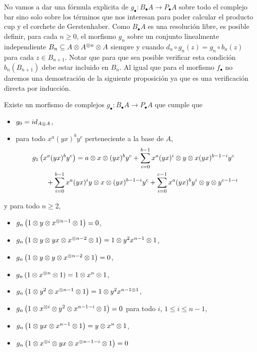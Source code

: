 \documentclass[fleqn,../tesis.tex]{subfiles}
\begin{document}
No vamos a dar una fórmula explicita de $g_{\bullet} : B_{\bullet}A \to P_{\bullet}A$ sobre todo el complejo bar
sino solo sobre los términos que nos interesan para poder calcular el producto cup y el corchete de Gerstenhaber.
Como $B_{\bullet}A$ es una resolución libre, es posible definir, para cada $n \geq  0$, el morfismo $g_n$
sobre un conjunto linealmente independiente $B_n \subseteq A\otimes A^{\otimes n}\otimes A$ siempre y cuando
$d_n \circ g_n(z) = g_n \circ b_n(z)$ para cada $z \in B_{n + 1}$. Notar que para que sea posible verificar esta
condición $b_n(B_{n + 1})$ debe estar incluido en $ B_{n}$. Al igual que para el morfismo $f_{\bullet}$
no daremos una demostración de la siguiente proposición ya que es una verificación directa por inducción.

\begin{prop}
	Existe un morfismo de complejos $g_{\bullet} : B_{\bullet}A \to P_{\bullet}A$ que cumple que
	\begin{itemize}
		\item $g_0 = id_{A\otimes A}$,
		\item para todo $x^{a}(yx)^{b}y^c$ perteneciente a la base de $A$,
		\begin{align*}
			&g_1\left(x^{a}(yx)^{b}y^c\right) = a\otimes x \otimes (yx)^by^c
				+ \sum_{i = 0}^{b - 1} x^{a}(yx)^{i}\otimes y \otimes x(yx)^{b - 1 - i}y^c\\
			&\qquad + \sum_{i = 0}^{b - 1}x^{a}(yx)^{i}y \otimes x \otimes (yx)^{b - 1 - i}y^c
				+ \sum_{i =0}^{c - 1}x^{a}(yx)^{b} y^{i}\otimes y \otimes y^{c - 1 - i}
		\end{align*}
	\end{itemize}
	y para todo $n \geq 2$,
	\begin{itemize}
		\item $g_n\left(1\otimes y \otimes x^{\otimes n - 1}\otimes 1\right) = 0$,
		\item $g_n\left(1\otimes y \otimes yx \otimes x^{ \otimes n - 2} \otimes 1\right) = 1\otimes y^2 x^{n - 1} \otimes 1$,
		\item $g_n\left(1\otimes y \otimes y \otimes x^{\otimes n - 2} \otimes 1\right) = 0$,
		\item $g_n\left(1\otimes x^{\otimes n} \otimes 1\right) = 1\otimes x^n \otimes 1$,
		\item $g_n\left(1\otimes y^2 \otimes x^{\otimes n - 1}\otimes 1\right) = 1 \otimes y^{2}x^{n - 1 \otimes 1}$,
		\item $g_n\left(1\otimes x^{\otimes i} \otimes y^{2} \otimes x^{n - 1 - i} \otimes 1\right) =  0$
			para todo $i$, $1 \leq i \leq n  - 1$,
		\item $g_n\left(1\otimes yx \otimes x^{n - 1} \otimes 1\right) = y\otimes x^{n}\otimes 1$,
		\item $g_n\left(1\otimes x^{\otimes i} \otimes yx \otimes x^{\otimes n - 1 - i}\otimes 1\right) = 0$

\end{itemize}
\end{prop}
\end{document}
